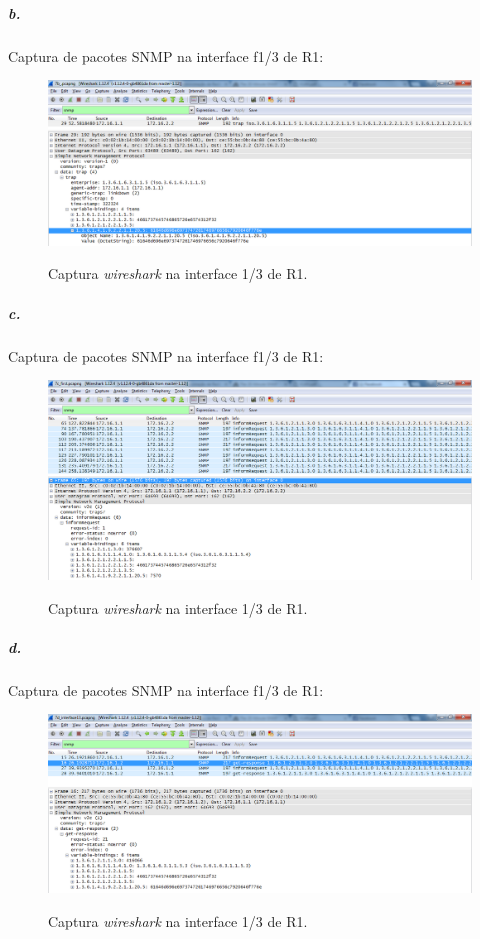\newpage

\subparagraph{b.}
Captura de pacotes SNMP na interface \textsf{f1/3} de \textsf{R1}:

\begin{figure}[h]
\centering
\includegraphics[width=1\textwidth, height=0.3\textheight]{7b.png}
\label{fig:11-capturaWireshark}
\caption{Captura \emph{wireshark} na interface \textsf{1/3} de \textsf{R1}.}
\end{figure}


\subparagraph{c.}
Captura de pacotes SNMP na interface \textsf{f1/3} de \textsf{R1}:

\begin{figure}[h]
\centering
\includegraphics[width=1\textwidth, height=0.33\textheight]{7c.png}
\label{fig:12-capturaWireshark}
\caption{Captura \emph{wireshark} na interface \textsf{1/3} de \textsf{R1}.}
\end{figure}

\newpage

\subparagraph{d.}
Captura de pacotes SNMP na interface \textsf{f1/3} de \textsf{R1}:

\begin{figure}[h]
\centering
\includegraphics[width=1\textwidth, height=0.3\textheight]{7d.png}
\label{fig:13-capturaWireshark}
\caption{Captura \emph{wireshark} na interface \textsf{1/3} de \textsf{R1}.}
\end{figure}



